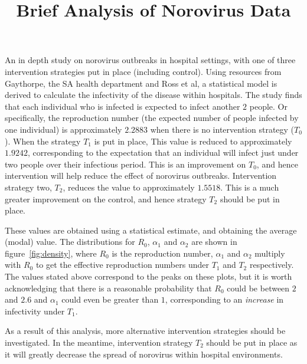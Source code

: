 \documentclass{X:/Documents/Coding/Latex/myassignment}
\title{Brief Analysis of Norovirus Data}
\begin{document}
\maketitle
\setlength{\parindent}{0pt}
An in depth study on norovirus outbreaks in hospital settings, with one of three intervention strategies put in place (including control). Using resources from Gaythorpe\parencite{dynamics}\parencite{model}, the SA health department\parencite{SAHD} and Ross et al\parencite{BLACK2015159}, a statistical model is derived to calculate the infectivity of the disease within hospitals. The study finds that each individual who is infected is expected to infect another $2$ people. Or specifically, the reproduction number (the expected number of people infected by one individual) is approximately $2.2883$ when there is no intervention strategy ($T_0$). When the strategy $T_1$ is put in place, This value is reduced to approximately $1.9242$, corresponding to the expectation that an individual will infect just under two people over their infectious period. This is an improvement on $T_0$, and hence intervention will help reduce the effect of norovirus outbreaks. Intervention strategy two, $T_2$, reduces the value to approximately $1.5518$. This is a much greater improvement on the control, and hence strategy $T_2$ should be put in place. 

These values are obtained using a statistical estimate, and obtaining the average (modal) value. The distributions for $R_0$, $\alpha_1$ and $\alpha_2$ are shown in figure~\ref{fig:density}, where $R_0$ is the reproduction number, $\alpha_1$ and $\alpha_2$ multiply with $R_0$ to get the effective reproduction numbers under $T_1$ and $T_2$ respectively. 
The values stated above correspond to the peaks on these plots, but it is worth acknowledging that there is a reasonable probability that $R_0$ could be between $2$ and $2.6$ and $\alpha_1$ could even be greater than $1$, corresponding to an \textit{increase} in infectivity under $T_1$.

\vspace{2em}

As a result of this analysis, more alternative intervention strategies should be investigated. In the meantime, intervention strategy $T_2$ should be put in place as it will greatly decrease the spread of norovirus within hospital environments. 
\end{document}
